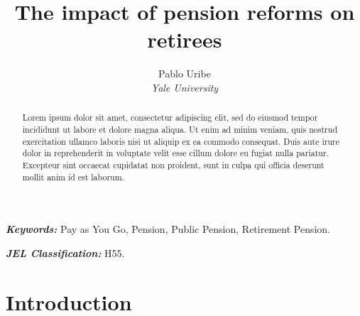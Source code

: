 \documentclass[12pt, a4paper]{article}
\begin{document}
\renewcommand{\BOthers}[1]{et al.\hbox{}}
\newcommand\fnote[1]{\captionsetup{font=footnotesize}\caption*{#1}}

\newcommand{\xxx}[2][show]{ %
 \ifthenelse{\equal{#1}{show} }{ \textcolor{red}{X #2 X}}{}}

\title{\Large \textbf{The impact of pension reforms on retirees}}
\author{Pablo Uribe \\ \small \textit{Yale University}} 
\maketitle

\vspace{-0.5cm}


\begin{abstract}
    
Lorem ipsum dolor sit amet, consectetur adipiscing elit, sed do eiusmod tempor incididunt ut labore et dolore magna aliqua. Ut enim ad minim veniam, quis nostrud exercitation ullamco laboris nisi ut aliquip ex ea commodo consequat. Duis aute irure dolor in reprehenderit in voluptate velit esse cillum dolore eu fugiat nulla pariatur. Excepteur sint occaecat cupidatat non proident, sunt in culpa qui officia deserunt mollit anim id est laborum.

\end{abstract}


\textit{\textbf{Keywords:}} Pay as You Go, Pension, Public Pension, Retirement Pension.

\vspace{0.5cm}
\textit{\textbf{JEL Classification:}} H55.

\vspace{.5cm}

\section{Introduction}
\end{document}
